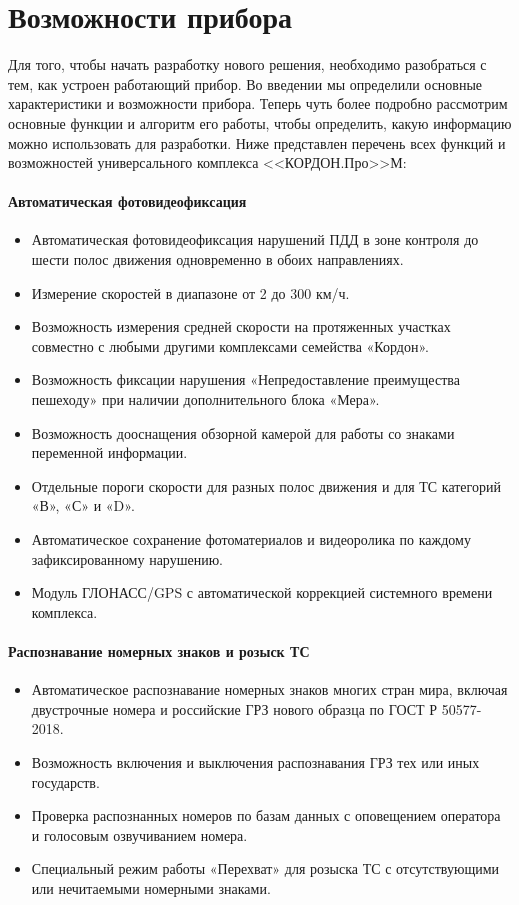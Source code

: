 \documentclass[specification,annotation,times]{itmo-student-thesis}
\begin{document}
\section{Возможности прибора} \label{sec:cordon-charact}
Для того, чтобы начать разработку нового решения, необходимо разобраться с тем, как устроен работающий прибор. Во введении мы определили основные характеристики и возможности прибора. Теперь чуть более подробно рассмотрим основные функции и алгоритм его работы, чтобы определить, какую информацию можно использовать для разработки. Ниже представлен перечень всех функций и возможностей универсального комплекса <<КОРДОН.Про>>М:

\paragraph{Автоматическая фотовидеофиксация}
\begin{itemize}
	\item Автоматическая фотовидеофиксация нарушений ПДД в зоне контроля до шести полос движения  одновременно в обоих направлениях.
	\item Измерение скоростей в диапазоне от 2 до 300 км/ч.
	\item Возможность измерения средней скорости на протяженных участках совместно с любыми другими комплексами семейства «Кордон».
	\item Возможность фиксации нарушения «Непредоставление преимущества пешеходу» при наличии дополнительного блока «Мера».
	\item Возможность дооснащения обзорной камерой для работы со знаками переменной информации.
	\item Отдельные пороги скорости для разных полос движения и для ТС категорий «В», «С» и «D».
	\item Автоматическое сохранение фотоматериалов и видеоролика по каждому зафиксированному нарушению.
	\item Модуль ГЛОНАСС/GPS с автоматической коррекцией системного времени комплекса.
\end{itemize}

\paragraph{Распознавание номерных знаков и розыск ТС}
\begin{itemize}
	\item Автоматическое распознавание номерных знаков многих стран мира, включая двустрочные номера и российские ГРЗ нового образца по ГОСТ Р 50577-2018.
	\item Возможность включения и выключения распознавания ГРЗ тех или иных государств.
	\item Проверка распознанных номеров по базам данных с оповещением оператора и голосовым озвучиванием номера.
	\item Специальный режим работы «Перехват» для розыска ТС с отсутствующими или нечитаемыми номерными знаками.
\end{itemize}
\end{document}
